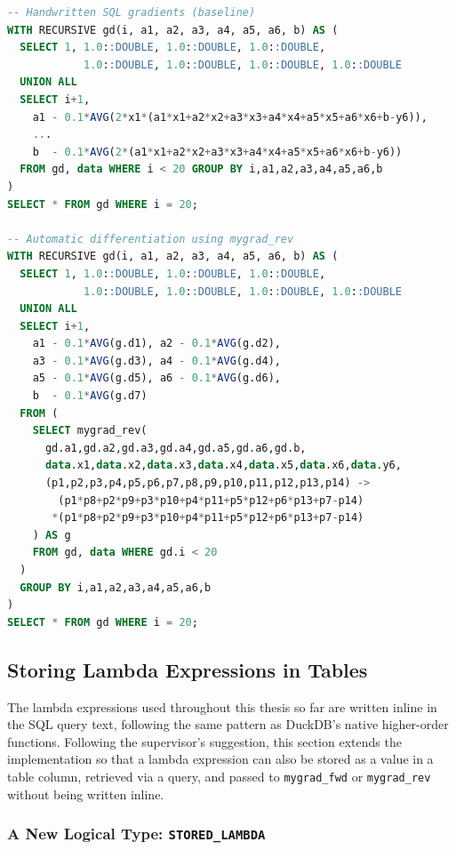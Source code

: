 \documentclass[12pt]{report}
\begin{document}
\begin{lstlisting}[language=SQL, caption={Gradient descent using
recursive tables: manually derived (lines 1--8) and using automatic
differentiation (lines 10--20).}, label={lst:gd-comparison}]
-- Handwritten SQL gradients (baseline)
WITH RECURSIVE gd(i, a1, a2, a3, a4, a5, a6, b) AS (
  SELECT 1, 1.0::DOUBLE, 1.0::DOUBLE, 1.0::DOUBLE,
            1.0::DOUBLE, 1.0::DOUBLE, 1.0::DOUBLE, 1.0::DOUBLE
  UNION ALL
  SELECT i+1,
    a1 - 0.1*AVG(2*x1*(a1*x1+a2*x2+a3*x3+a4*x4+a5*x5+a6*x6+b-y6)),
    ...
    b  - 0.1*AVG(2*(a1*x1+a2*x2+a3*x3+a4*x4+a5*x5+a6*x6+b-y6))
  FROM gd, data WHERE i < 20 GROUP BY i,a1,a2,a3,a4,a5,a6,b
)
SELECT * FROM gd WHERE i = 20;

-- Automatic differentiation using mygrad_rev
WITH RECURSIVE gd(i, a1, a2, a3, a4, a5, a6, b) AS (
  SELECT 1, 1.0::DOUBLE, 1.0::DOUBLE, 1.0::DOUBLE,
            1.0::DOUBLE, 1.0::DOUBLE, 1.0::DOUBLE, 1.0::DOUBLE
  UNION ALL
  SELECT i+1,
    a1 - 0.1*AVG(g.d1), a2 - 0.1*AVG(g.d2),
    a3 - 0.1*AVG(g.d3), a4 - 0.1*AVG(g.d4),
    a5 - 0.1*AVG(g.d5), a6 - 0.1*AVG(g.d6),
    b  - 0.1*AVG(g.d7)
  FROM (
    SELECT mygrad_rev(
      gd.a1,gd.a2,gd.a3,gd.a4,gd.a5,gd.a6,gd.b,
      data.x1,data.x2,data.x3,data.x4,data.x5,data.x6,data.y6,
      (p1,p2,p3,p4,p5,p6,p7,p8,p9,p10,p11,p12,p13,p14) ->
        (p1*p8+p2*p9+p3*p10+p4*p11+p5*p12+p6*p13+p7-p14)
       *(p1*p8+p2*p9+p3*p10+p4*p11+p5*p12+p6*p13+p7-p14)
    ) AS g
    FROM gd, data WHERE gd.i < 20
  )
  GROUP BY i,a1,a2,a3,a4,a5,a6,b
)
SELECT * FROM gd WHERE i = 20;
\end{lstlisting}

\subsection{Storing Lambda Expressions in Tables}
\label{sec:stored-lambda}

The lambda expressions used throughout this thesis so far are written inline
in the SQL query text, following the same pattern as DuckDB's native
higher-order functions. Following the supervisor's suggestion, this section
extends the implementation so that a lambda expression can also be stored as
a value in a table column, retrieved via a query, and passed to
\texttt{mygrad\_fwd} or \texttt{mygrad\_rev} without being written inline.

\subsubsection{A New Logical Type: \texttt{STORED\_LAMBDA}}
\end{document}
